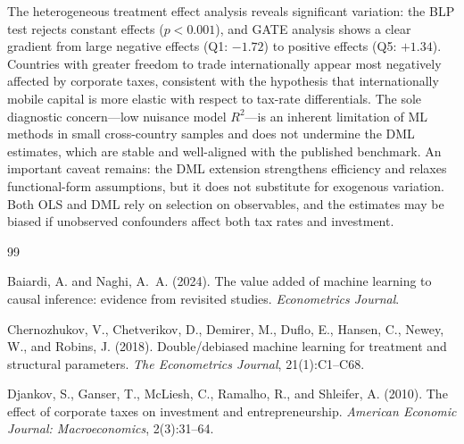 \documentclass[12pt]{article}
\begin{document}
The heterogeneous treatment effect analysis reveals significant variation: the BLP
test rejects constant effects ($p < 0.001$), and GATE analysis shows a clear
gradient from large negative effects (Q1: $-1.72$) to positive effects (Q5: $+1.34$).
Countries with greater freedom to trade internationally appear most negatively
affected by corporate taxes, consistent with the hypothesis that internationally
mobile capital is more elastic with respect to tax-rate differentials. The sole diagnostic concern---low nuisance model
$R^2$---is an inherent limitation of ML methods in small cross-country samples and
does not undermine the DML estimates, which are stable and well-aligned with the
published benchmark. An important caveat remains: the DML extension strengthens
efficiency and relaxes functional-form assumptions, but it does not substitute for
exogenous variation. Both OLS and DML rely on selection on observables, and the
estimates may be biased if unobserved confounders affect both tax rates and
investment.


\begin{thebibliography}{99}

Baiardi, A. and Naghi, A.~A. (2024).
\newblock The value added of machine learning to causal inference: evidence from
  revisited studies.
\newblock \textit{Econometrics Journal}.

Chernozhukov, V., Chetverikov, D., Demirer, M., Duflo, E., Hansen, C.,
  Newey, W., and Robins, J. (2018).
\newblock Double/debiased machine learning for treatment and structural
  parameters.
\newblock \textit{The Econometrics Journal}, 21(1):C1--C68.

Djankov, S., Ganser, T., McLiesh, C., Ramalho, R., and Shleifer, A. (2010).
\newblock The effect of corporate taxes on investment and entrepreneurship.
\newblock \textit{American Economic Journal: Macroeconomics}, 2(3):31--64.

\end{thebibliography}
\end{document}

